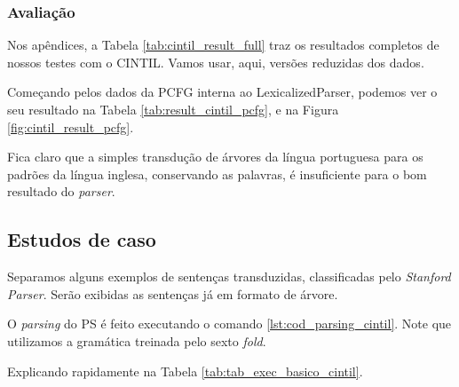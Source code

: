 \subsubsection{Avaliação} 
\label{result_aval_cintil}

Nos apêndices, a Tabela \ref{tab:cintil_result_full} traz os resultados completos de nossos testes com o CINTIL. Vamos usar, aqui, versões reduzidas dos dados.

Começando pelos dados da PCFG interna ao LexicalizedParser, podemos ver o seu resultado na Tabela \ref{tab:result_cintil_pcfg}, e na Figura \ref{fig:cintil_result_pcfg}.
\begin{center}
    
\end{center}

Fica claro que a simples transdução de árvores da língua portuguesa para os padrões da língua inglesa, conservando as palavras, é insuficiente para o bom resultado do \textit{parser}.

\begin{center}
    
\end{center}

\subsection{Estudos de caso}
\label{subsec:ec_cintil}

Separamos alguns exemplos de sentenças transduzidas, classificadas pelo \textit{Stanford Parser}. Serão exibidas as sentenças já em formato de árvore. 

O \textit{parsing} do PS é feito executando o comando \ref{lst:cod_parsing_cintil}. Note que utilizamos a gramática treinada pelo sexto \textit{fold}.
\begin{center}
    
\end{center}

Explicando rapidamente na Tabela \ref{tab:tab_exec_basico_cintil}.

\begin{center}
    
\end{center}

\begin{center}
    
\end{center}

